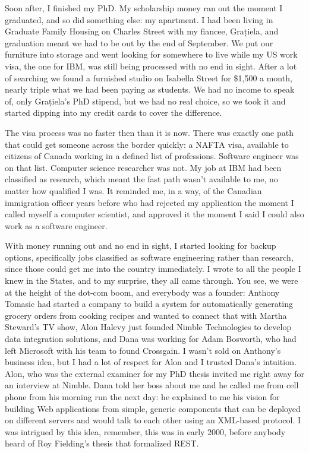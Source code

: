 \documentclass[12pt]{book}
\begin{document}
Soon after, I finished my PhD. My scholarship money ran out the moment I
graduated, and so did something else: my apartment. I had been living in
Graduate Family Housing on Charles Street with my fiancee, Grațiela, and
graduation meant we had to be out by the end of September. We put our
furniture into storage and went looking for somewhere to live while my
US work visa, the one for IBM, was still being processed with no end in
sight. After a lot of searching we found a furnished studio on Isabella
Street for \$1,500 a month, nearly triple what we had been paying as
students. We had no income to speak of, only Grațiela's PhD stipend, but
we had no real choice, so we took it and started dipping into my credit
cards to cover the difference.

The visa process was no faster then than it is now. There was exactly
one path that could get someone across the border quickly: a NAFTA visa,
available to citizens of Canada working in a defined list of
professions. Software engineer was on that list. Computer science
researcher was not. My job at IBM had been classified as research, which
meant the fast path wasn't available to me, no matter how qualified I
was. It reminded me, in a way, of the Canadian immigration officer years
before who had rejected my application the moment I called myself a
computer scientist, and approved it the moment I said I could also work
as a software engineer.

With money running out and no end in sight, I started looking for backup
options, specifically jobs classified as software engineering rather
than research, since those could get me into the country immediately. I
wrote to all the people I knew in the States, and to my surprise, they
all came through. You see, we were at the height of the dot-com boom,
and everybody was a founder: Anthony Tomasic had started a company to
build a system for automatically generating grocery orders from cooking
recipes and wanted to connect that with Martha Steward's TV show, Alon
Halevy just founded Nimble Technologies to develop data integration
solutions, and Dana was working for Adam Bosworth, who had left
Microsoft with his team to found Crossgain. I wasn't sold on Anthony's
business idea, but I had a lot of respect for Alon and I trusted Dana's
intuition. Alon, who was the external examiner for my PhD thesis invited
me right away for an interview at Nimble. Dana told her boss about me
and he called me from cell phone from his morning run the next day: he
explained to me his vision for building Web applications from simple,
generic components that can be deployed on different servers and would
talk to each other using an XML-based protocol. I was intrigued by this
idea, remember, this was in early 2000, before anybody heard of Roy
Fielding's thesis that formalized REST.
\end{document}
